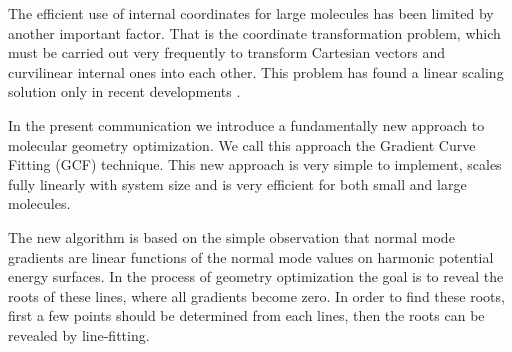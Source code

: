 \documentclass[prl,aps,twocolumn,showpacs,twocolumngrid,superbib]{revtex4}
\begin{document}
The efficient use of internal coordinates for large molecules has 
been limited by another important factor. That is the coordinate
transformation problem, which must be carried out very frequently
to transform Cartesian vectors and curvilinear internal ones into each
other. This problem has found a linear scaling solution   
only in recent developments 
\cite{paizs_coordtrf1,nemeth_coordtrf1,paizs_coordtrf2,nemeth_coordtrf2,billeter_coordtrf,andzelm_coordtrf,kudin_coordtrf}. 

In the present communication we introduce a fundamentally new approach
to molecular geometry optimization. We call this approach the
Gradient Curve Fitting (GCF) technique. This new approach is very simple
to implement, scales fully linearly with system size 
and is very efficient for both small and large molecules.

The new algorithm is based on the simple observation that
normal mode gradients are linear functions of the normal mode values 
on harmonic potential energy surfaces. 
In the process of geometry optimization the goal is to reveal the roots
of these lines, where all gradients become zero. In order to 
find these roots, first a few points should be determined from each
lines, then the roots can be revealed by line-fitting. 
\end{document}
